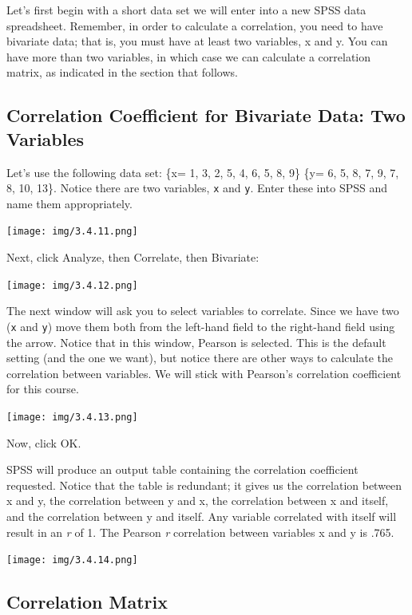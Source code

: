\documentclass[
]{book}
\begin{document}
Let's first begin with a short data set we will enter into a new SPSS data spreadsheet. Remember, in order to calculate a correlation, you need to have bivariate data; that is, you must have at least two variables, x and y. You can have more than two variables, in which case we can calculate a correlation matrix, as indicated in the section that follows.

\hypertarget{correlation-coefficient-for-bivariate-data-two-variables}{%
\subsection{Correlation Coefficient for Bivariate Data: Two Variables}\label{correlation-coefficient-for-bivariate-data-two-variables}}

Let's use the following data set: \{x= 1, 3, 2, 5, 4, 6, 5, 8, 9\} \{y= 6, 5, 8, 7, 9, 7, 8, 10, 13\}. Notice there are two variables, \texttt{x} and \texttt{y}. Enter these into SPSS and name them appropriately.

\texttt{[image: img/3.4.11.png]}

Next, click {Analyze}, then {Correlate}, then {Bivariate}:

\texttt{[image: img/3.4.12.png]}

The next window will ask you to select variables to correlate. Since we have two (\texttt{x} and \texttt{y}) move them both from the left-hand field to the right-hand field using the arrow. Notice that in this window, {Pearson} is selected. This is the default setting (and the one we want), but notice there are other ways to calculate the correlation between variables. We will stick with Pearson's correlation coefficient for this course.

\texttt{[image: img/3.4.13.png]}

Now, click {OK}.

SPSS will produce an output table containing the correlation coefficient requested. Notice that the table is redundant; it gives us the correlation between x and y, the correlation between y and x, the correlation between x and itself, and the correlation between y and itself. Any variable correlated with itself will result in an \emph{r} of 1. The Pearson \emph{r} correlation between variables x and y is .765.

\texttt{[image: img/3.4.14.png]}

\hypertarget{correlation-matrix}{%
\subsection{Correlation Matrix}\label{correlation-matrix}}
\end{document}
